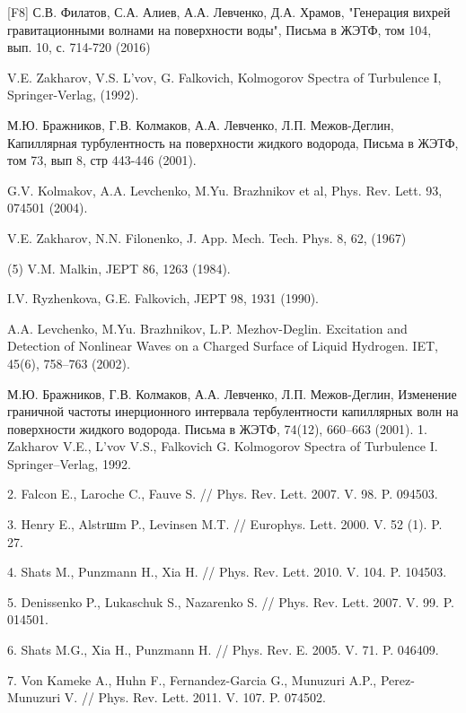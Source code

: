 [F8] С.В. Филатов, С.А. Алиев, А.А. Левченко, Д.А. Храмов, "Генерация вихрей гравитационными волнами на поверхности воды", Письма в ЖЭТФ, том 104, вып.  10, с. 714-720 (2016)


\begin{thebibliography}{99}

V.E. Zakharov, V.S. L'vov, G. Falkovich, Kolmogorov Spectra of Turbulence I, Springer-Verlag, (1992).

М.Ю. Бражников, Г.В. Колмаков, А.А. Левченко, Л.П. Межов-Деглин, Капиллярная турбулентность на поверхности жидкого водорода, Письма в ЖЭТФ, том 73, вып 8, стр 443-446 (2001).
 
G.V. Kolmakov, A.A. Levchenko, M.Yu. Brazhnikov et al, Phys. Rev. Lett. 93, 074501 (2004).

V.E. Zakharov, N.N. Filonenko, J. App. Mech. Tech. Phys. 8, 62, (1967)

\bibitem(5)
V.M. Malkin, JEPT 86, 1263 (1984).

I.V. Ryzhenkova, G.E. Falkovich, JEPT 98, 1931 (1990).

A.A. Levchenko, M.Yu. Brazhnikov, L.P. Mezhov-Deglin. Excitation and Detection of Nonlinear Waves on a Charged Surface of Liquid Hydrogen. IET, 45(6), 758–763 (2002).

М.Ю. Бражников, Г.В. Колмаков, А.А. Левченко, Л.П. Межов-Деглин, Изменение граничной частоты инерционного интервала тербулентности капиллярных волн на поверхности жидкого водорода. Письма в ЖЭТФ, 74(12), 660–663 (2001).
1. Zakharov V.E., L’vov V.S., Falkovich G. Kolmogorov Spectra of Turbulence I. Springer–Verlag, 1992.

2. Falcon E., Laroche C., Fauve S. // Phys. Rev. Lett. 2007. V. 98. P. 094503.

3. Henry E., Alstrшm P., Levinsen M.T. // Europhys. Lett. 2000. V. 52 (1). P. 27.

4. Shats M., Punzmann H., Xia H. // Phys. Rev. Lett. 2010. V. 104. P. 104503.

5. Denissenko P., Lukaschuk S., Nazarenko S. // Phys. Rev. Lett. 2007. V. 99. P. 014501.

6. Shats M.G., Xia H., Punzmann H. // Phys. Rev. E. 2005. V. 71. P. 046409.

7. Von Kameke A., Huhn F., Fernandez-Garcia G., Munuzuri A.P., Perez-Munuzuri V. // Phys. Rev. Lett. 2011. V. 107. P. 074502.


\end{thebibliography}
